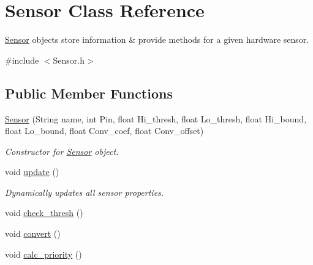 \hypertarget{classSensor}{}\section{Sensor Class Reference}
\label{classSensor}


\hyperlink{classSensor}{Sensor} objects store information \& provide methods for a given hardware sensor.  




{\ttfamily \#include $<$Sensor.\+h$>$}

\subsection*{Public Member Functions}
\begin{DoxyCompactItemize}
\item 
\hyperlink{classSensor_a48d3fd5b0aefcf7ca3cfeebb22d54caa}{Sensor} (String name, int Pin, float Hi\+\_\+thresh, float Lo\+\_\+thresh, float Hi\+\_\+bound, float Lo\+\_\+bound, float Conv\+\_\+coef, float Conv\+\_\+offset)
\begin{DoxyCompactList}\small\item\em Constructor for \hyperlink{classSensor}{Sensor} object. \end{DoxyCompactList}\item 
void \hyperlink{classSensor_a542a721041768395de2c6e9012622113}{update} ()
\begin{DoxyCompactList}\small\item\em Dynamically updates all sensor properties. \end{DoxyCompactList}\item 
void \hyperlink{classSensor_ae57d3c8aa71dc50dca5000bfefc7c814}{check\+\_\+thresh} ()
\item 
void \hyperlink{classSensor_a8fafee0772386f423b010742413f50cd}{convert} ()
\item 
void \hyperlink{classSensor_a083c25b32b7893ea7c5d5e76dbc7503d}{calc\+\_\+priority} ()
\end{DoxyCompactItemize}
